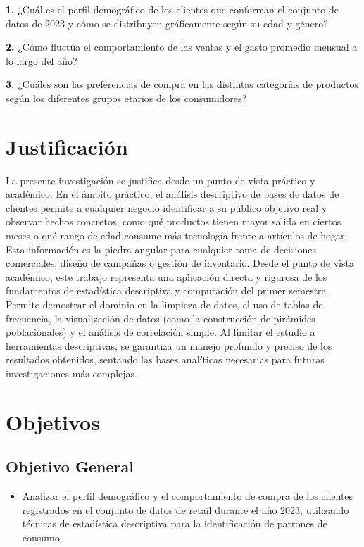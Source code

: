 \documentclass[oneside,11pt]{Latex/Classes/PhDthesisPSnPDF}
\begin{document}
\textbf{1.} ¿Cuál es el perfil demográfico de los clientes que conforman
el conjunto de datos de 2023 y cómo se distribuyen gráficamente según su
edad y género?

\textbf{2.} ¿Cómo fluctúa el comportamiento de las ventas y el gasto
promedio mensual a lo largo del año?

\textbf{3.} ¿Cuáles son las preferencias de compra en las distintas
categorías de productos según los diferentes grupos etarios de los
consumidores?\\

\section{Justificación}

La presente investigación se justifica desde un punto de vista práctico
y académico. En el ámbito práctico, el análisis descriptivo de bases de
datos de clientes permite a cualquier negocio identificar a su público
objetivo real y observar hechos concretos, como qué productos tienen
mayor salida en ciertos meses o qué rango de edad consume más tecnología
frente a artículos de hogar. Esta información es la piedra angular para
cualquier toma de decisiones comerciales, diseño de campañas o gestión
de inventario. Desde el punto de vista académico, este trabajo
representa una aplicación directa y rigurosa de los fundamentos de
estadística descriptiva y computación del primer semestre. Permite
demostrar el dominio en la limpieza de datos, el uso de tablas de
frecuencia, la visualización de datos (como la construcción de pirámides
poblacionales) y el análisis de correlación simple. Al limitar el
estudio a herramientas descriptivas, se garantiza un manejo profundo y
preciso de los resultados obtenidos, sentando las bases analíticas
necesarias para futuras investigaciones más complejas.\\

\section{Objetivos}

\subsection{Objetivo General}
\begin{itemize}
  \item{Analizar el perfil demográfico y el comportamiento de compra de los clientes registrados en el conjunto de datos de retail durante el año 2023, utilizando técnicas de estadística descriptiva para la identificación de patrones de consumo.}
\end{itemize}
\end{document}
